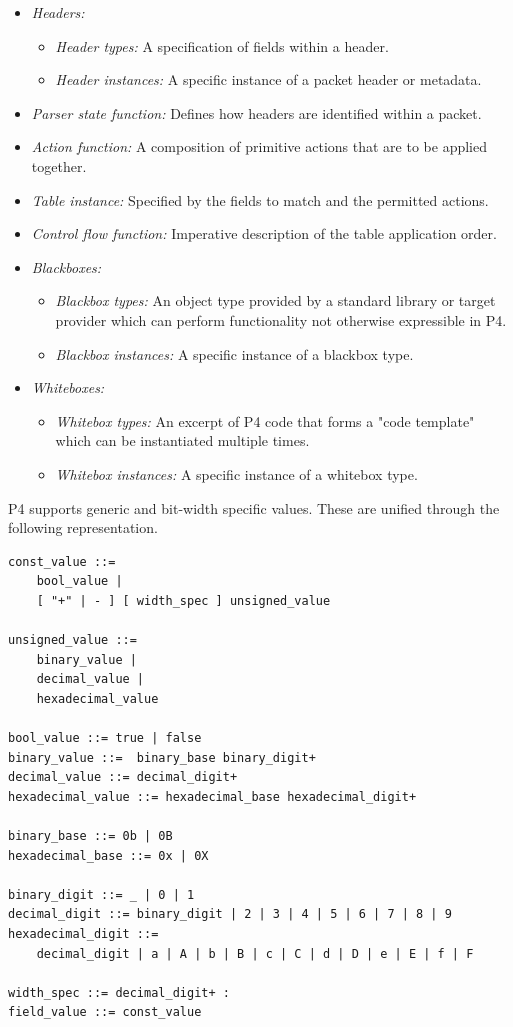 \documentclass[12pt]{article}
\begin{document}
\begin{itemize}
\item
\textit{Headers:}
\begin{itemize}
\item
\textit{Header types:} A specification of fields within a header.
\item
\textit{Header instances:} A specific instance of a packet header or metadata.
\end{itemize}
\item
\textit{Parser state function:} Defines how headers are identified
within a packet.
\item
\textit{Action function:} A composition of primitive actions that are to be applied 
together.
\item
\textit{Table instance:} Specified by the fields to match and the permitted actions.
\item
\textit{Control flow function:} Imperative description of the table application
order. 
\item
\textit{Blackboxes:}
\begin{itemize}
\item
\textit{Blackbox types:} An object type provided by a standard library 
or target provider which can perform functionality not otherwise expressible
in P4.
\item
\textit{Blackbox instances:} A specific instance of a blackbox type.
\end{itemize}
\item
\textit{Whiteboxes:}
\begin{itemize}
\item
\textit{Whitebox types:} An excerpt of P4 code that forms a "code template"
which can be instantiated multiple times.
\item
\textit{Whitebox instances:} A specific instance of a whitebox type.
\end{itemize}
\end{itemize}



P4 supports generic and bit-width specific values. These are unified through
the following representation.

\begin{lstlisting}[style=BNFstyle]
const_value ::=
    bool_value |
    [ "+" | - ] [ width_spec ] unsigned_value

unsigned_value ::= 
    binary_value | 
    decimal_value | 
    hexadecimal_value

bool_value ::= true | false
binary_value ::=  binary_base binary_digit+
decimal_value ::= decimal_digit+
hexadecimal_value ::= hexadecimal_base hexadecimal_digit+

binary_base ::= 0b | 0B
hexadecimal_base ::= 0x | 0X

binary_digit ::= _ | 0 | 1
decimal_digit ::= binary_digit | 2 | 3 | 4 | 5 | 6 | 7 | 8 | 9
hexadecimal_digit ::= 
    decimal_digit | a | A | b | B | c | C | d | D | e | E | f | F

width_spec ::= decimal_digit+ :
field_value ::= const_value
\end{lstlisting}
\end{document}
